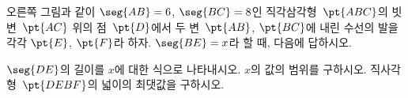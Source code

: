\noindent\begin{minipage}[t]{0.58\linewidth}\vspace{0pt}\raggedright 오른쪽 그림과 같이 $\seg{AB}=6$, $\seg{BC}=8$인 직각삼각형~$\pt{ABC}$의 빗변~$\pt{AC}$ 위의 점~$\pt{D}$에서 두 변~$\pt{AB}$, $\pt{BC}$에 내린 수선의 발을 각각 $\pt{E}$, $\pt{F}$라 하자. $\seg{BE}=x$라 할 때, 다음에 답하시오.\end{minipage}\hfill\begin{minipage}[t]{0.4\linewidth}\vspace{0pt}\centering \resizebox{\ifdim\width>\linewidth\linewidth\else\width\fi}{!}{}\end{minipage}\par
{} $\seg{DE}$의 길이를 $x$에 대한 식으로 나타내시오.
 $x$의 값의 범위를 구하시오.
 직사각형~$\pt{DEBF}$의 넓이의 최댓값을 구하시오.
